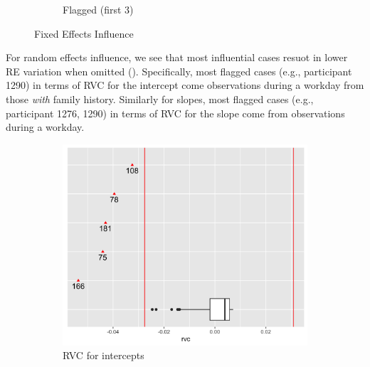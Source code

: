 \documentclass[12pt,twoside,letterpaper]{article}
\theoremstyle{definition}
\theoremstyle{definition}
\begin{document}
\begin{figure}[H]
\begin{subfigure}[b]{0.38\textwidth}
    \caption[]%
    {{\small Flagged (first 3) }}
    \label{fig: cook flagged}
    \end{subfigure}
    \caption[]
    {\small Fixed Effects Influence}
    \label{fig: cook and flagged}
    \end{figure}

For random effects influence, we see that most influential cases resuot in lower RE variation when omitted (). Specifically, most flagged cases (e.g., participant 1290) in terms of RVC for the intercept come observations during a workday from those \emph{with} family history. Similarly for slopes, most flagged cases (e.g., participant 1276, 1290) in terms of RVC for the slope come from observations during a workday.
\begin{figure}[H] 
    \centering
    \begin{subfigure}[b]{0.36\textwidth}
    \centering
    \includegraphics[width=\textwidth]{pics/rvc int.png}
    \caption[]%
    {{\small RVC for intercepts}}
    \label{fig: rvc int}
    \end{subfigure}
    \begin{subfigure}[b]{0.36\textwidth}
    \centering

\end{subfigure}
\end{figure}
\end{document}
